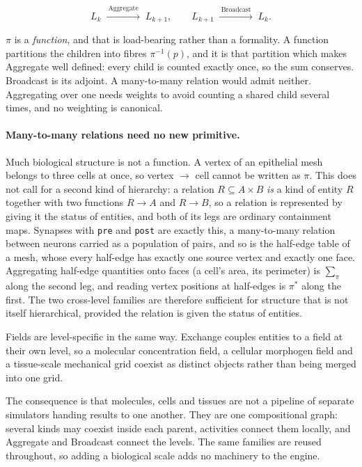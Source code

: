 \documentclass[11pt]{article}
\newcommand{\code}[1]{\texttt{#1}}
\begin{document}
\[
L_k \;\xrightarrow{\ \text{Aggregate}\ }\; L_{k+1},
\qquad
L_{k+1} \;\xrightarrow{\ \text{Broadcast}\ }\; L_k .
\]

$\pi$ is a \emph{function}, and that is load-bearing rather than a formality. A
function partitions the children into fibres $\pi^{-1}(p)$, and it is that partition
which makes Aggregate well defined: every child is counted exactly once, so the sum
conserves. Broadcast is its adjoint. A many-to-many relation would admit neither.
Aggregating over one needs weights to avoid counting a shared child several times, and
no weighting is canonical.

\paragraph{Many-to-many relations need no new primitive.} Much biological structure
is not a function. A vertex of an epithelial mesh belongs to three cells at once, so
vertex $\to$ cell cannot be written as $\pi$. This does not call for a second kind of
hierarchy: a relation $R \subseteq A \times B$ \emph{is} a kind of entity $R$ together
with two functions $R \to A$ and $R \to B$, so a relation is represented by giving it
the status of entities, and both of its legs are ordinary containment maps. Synapses
with \code{pre} and \code{post} are exactly this, a many-to-many relation between
neurons carried as a population of pairs, and so is the half-edge table of a mesh,
whose every half-edge has exactly one source vertex and exactly one face. Aggregating
half-edge quantities onto faces (a cell's area, its perimeter) is $\sum_\pi$ along the
second leg, and reading vertex positions at half-edges is $\pi^{*}$ along the first.
The two cross-level families are therefore sufficient for structure that is not
itself hierarchical, provided the relation is given the status of entities.

Fields are level-specific in the same way. Exchange couples entities to a field at
their own level, so a molecular concentration field, a cellular morphogen field and a
tissue-scale mechanical grid coexist as distinct objects rather than being merged into
one grid.

The consequence is that molecules, cells and tissues are not a pipeline of separate
simulators handing results to one another. They are one compositional graph: several
kinds may coexist inside each parent, activities connect them locally, and Aggregate
and Broadcast connect the levels. The same families are reused throughout, so adding a
biological scale adds no machinery to the engine.
\end{document}
